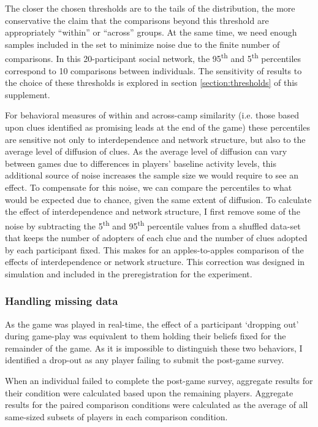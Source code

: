\documentclass{article}
\begin{document}
The closer the chosen thresholds are to the tails of the distribution, the more conservative the claim that the comparisons beyond this threshold are appropriately ``within'' or ``across'' groups. At the same time, we need enough samples included in the set to minimize noise due to the finite number of comparisons. In this 20-participant social network, the 95\textsuperscript{th} and 5\textsuperscript{th} percentiles correspond to 10 comparisons between individuals. The sensitivity of results to the choice of these thresholds is explored in section \ref{section:thresholds} of this supplement.

For behavioral measures of within and across-camp similarity (i.e. those based upon clues identified as promising leads at the end of the game) these percentiles are sensitive not only to interdependence and network structure, but also to the average level of diffusion of clues. As the average level of diffusion can vary between games due to differences in players' baseline activity levels, this additional source of noise increases the sample size we would require to see an effect. To compensate for this noise, we can compare the percentiles to what would be expected due to chance, given the same extent of diffusion. To calculate the effect of interdependence and network structure, I first remove some of the noise by subtracting the 5\textsuperscript{th} and 95\textsuperscript{th} percentile values from a shuffled data-set that keeps the number of adopters of each clue and the number of clues adopted by each participant fixed. This makes for an apples-to-apples comparison of the effects of interdependence or network structure. This correction was designed in simulation and included in the preregistration for the experiment.

\subsubsection{Handling missing data}

As the game was played in real-time, the effect of a participant ‘dropping out’ during game-play was equivalent to them holding their beliefs fixed for the remainder of the game. As it is impossible to distinguish these two behaviors, I identified a drop-out as any player failing to submit the post-game survey. 

When an individual failed to complete the post-game survey, aggregate results for their condition were calculated based upon the remaining players. Aggregate results for the paired comparison conditions were calculated as the average of all same-sized subsets of players in each comparison condition.
\end{document}
